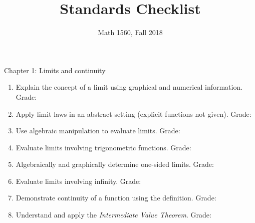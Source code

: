 \documentclass[11pt,letterpaper]{amsart}
\author{Math 1560, Fall 2018}
\title{Standards Checklist}
\begin{document}
\maketitle


Chapter 1: Limits and continuity %
\begin{enumerate}
\item Explain the concept of a limit using graphical and numerical information.\hspace*{\fill} Grade:  \quad {} \quad {}
\item Apply limit laws in an abstract setting (explicit functions not given).\hspace*{\fill} Grade:  \quad {} \quad {}
\item Use algebraic manipulation to evaluate limits.\hspace*{\fill} Grade:  \quad {} \quad {}
\item Evaluate limits involving trigonometric functions.\hspace*{\fill} Grade:  \quad {} \quad {}
\item Algebraically and graphically determine one-sided limits.\hspace*{\fill} Grade:  \quad {} \quad {}
\item Evaluate limits involving infinity.\hspace*{\fill} Grade:  \quad {} \quad {}
\item Demonstrate continuity of a function using the definition.\hspace*{\fill} Grade:  \quad {} \quad {}
\item Understand and apply the \emph{Intermediate Value Theorem}.\hspace*{\fill} Grade:  \quad {} \quad {}
\end{enumerate}
%
\bigskip
\end{document}
